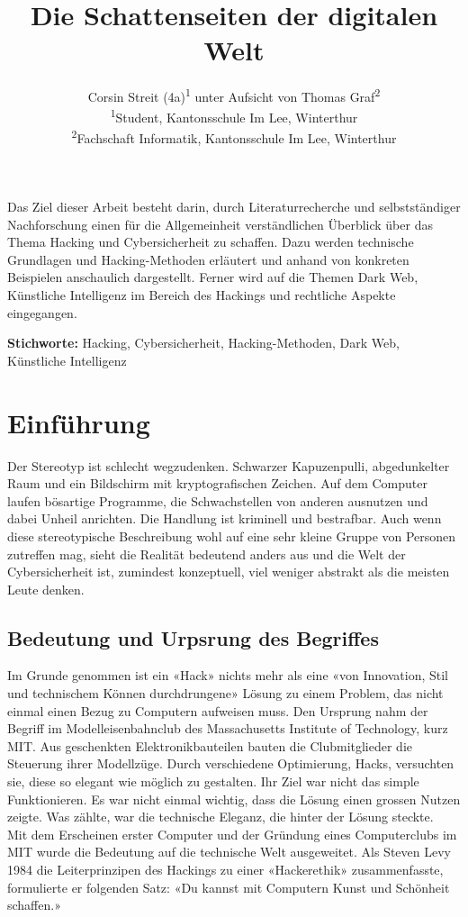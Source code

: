 \documentclass[12pt, a4paper]{article}
\title{\articletype{Hacking und Cybersicherheit} Die Schattenseiten der digitalen Welt}
\author{Corsin Streit (4a)\textsuperscript{1} unter Aufsicht von Thomas Graf\textsuperscript{2} \\
{\footnotesize \textsuperscript{1}Student, Kantonsschule Im Lee, Winterthur} \\
{\footnotesize \textsuperscript{2}Fachschaft Informatik, Kantonsschule Im Lee, Winterthur} \\
}
\date{
	\vspace{12pt}
	\begin{flushleft}
		\normalsize Winterthur, 20. November 2024
	\end{flushleft}
}
\renewenvironment{abstract}
  {\begin{mdframed}[
    backgroundcolor=gray!20, 
    innertopmargin=10pt, 
    innerbottommargin=15pt, 
    innerleftmargin=15pt, 
    innerrightmargin=15pt, 
    linewidth=0pt, 
    roundcorner=0pt,
    frametitleaboveskip=5mm, 
    frametitlebelowskip=-1mm, 
    frametitle={\bfseries Abstrakt}, 
    frametitlefont={\bfseries},
    frametitlealignment=\raggedright
    ]
   \vspace{2mm}}
  {\end{mdframed}}
\newcommand{\keywords}[1]{
  \vspace{12pt} 
  \par\noindent\textbf{Stichworte:} #1
}
\begin{document}
\maketitle
\thispagestyle{firstpage}


\begin{abstract}
Das Ziel dieser Arbeit besteht darin, durch Literaturrecherche und selbstständiger Nachforschung einen für die Allgemeinheit verständlichen Überblick über das Thema Hacking und Cybersicherheit zu schaffen. Dazu werden technische Grundlagen und Hacking-Methoden erläutert und anhand von konkreten Beispielen anschaulich dargestellt. Ferner wird auf die Themen Dark Web, Künstliche Intelligenz im Bereich des Hackings und rechtliche Aspekte eingegangen.
\end{abstract}

\keywords{Hacking, Cybersicherheit, Hacking-Methoden, Dark Web, Künstliche Intelligenz}

\newpage
\tableofcontents
\newpage



\section{Einführung}
Der Stereotyp ist schlecht wegzudenken. Schwarzer Kapuzenpulli, abgedunkelter Raum und ein Bildschirm mit kryptografischen Zeichen. Auf dem Computer laufen bösartige Programme, die Schwachstellen von anderen ausnutzen und dabei Unheil anrichten. Die Handlung ist kriminell und bestrafbar. Auch wenn diese stereotypische Beschreibung wohl auf eine sehr kleine Gruppe von Personen zutreffen mag, sieht die Realität bedeutend anders aus und die Welt der Cybersicherheit ist, zumindest konzeptuell, viel weniger abstrakt als die meisten Leute denken. 

\subsection{Bedeutung und Urpsrung des Begriffes}
Im Grunde genommen ist ein «Hack» nichts mehr als eine «von Innovation, Stil und technischem Können durchdrungene» Lösung zu einem Problem, das nicht einmal einen Bezug zu Computern aufweisen muss. Den Ursprung nahm der Begriff im Modelleisenbahnclub des Massachusetts Institute of Technology, kurz MIT. Aus geschenkten Elektronikbauteilen bauten die Clubmitglieder die Steuerung ihrer Modellzüge. Durch verschiedene Optimierung, Hacks, versuchten sie, diese so elegant wie möglich zu gestalten. Ihr Ziel war nicht das simple Funktionieren. Es war nicht einmal wichtig, dass die Lösung einen grossen Nutzen zeigte. Was zählte, war die technische Eleganz, die hinter der Lösung steckte. \\Mit dem Erscheinen erster Computer und der Gründung eines Computerclubs im MIT wurde die Bedeutung auf die technische Welt ausgeweitet. Als Steven Levy 1984 die Leiterprinzipen des Hackings zu einer «Hackerethik» zusammenfasste, formulierte er folgenden Satz: «Du kannst mit Computern Kunst und Schönheit schaffen.» \cite{bpbKleineGeschichte:online}
\end{document}
